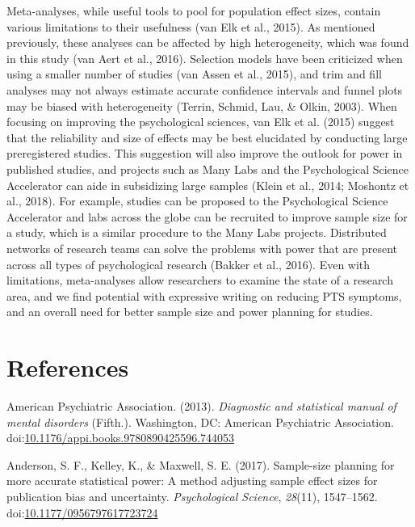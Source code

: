 \documentclass[,man]{apa6}
\begin{document}
Meta-analyses, while useful tools to pool for population effect sizes, contain various limitations to their usefulness (van Elk et al., 2015). As mentioned previously, these analyses can be affected by high heterogeneity, which was found in this study (van Aert et al., 2016). Selection models have been criticized when using a smaller number of studies (van Assen et al., 2015), and trim and fill analyses may not always estimate accurate confidence intervals and funnel plots may be biased with heterogeneity (Terrin, Schmid, Lau, \& Olkin, 2003). When focusing on improving the psychological sciences, van Elk et al. (2015) suggest that the reliability and size of effects may be best elucidated by conducting large preregistered studies. This suggestion will also improve the outlook for power in published studies, and projects such as Many Labs and the Psychological Science Accelerator can aide in subsidizing large samples (Klein et al., 2014; Moshontz et al., 2018). For example, studies can be proposed to the Psychological Science Accelerator and labs across the globe can be recruited to improve sample size for a study, which is a similar procedure to the Many Labs projects. Distributed networks of research teams can solve the problems with power that are present across all types of psychological research (Bakker et al., 2016). Even with limitations, meta-analyses allow researchers to examine the state of a research area, and we find potential with expressive writing on reducing PTS symptoms, and an overall need for better sample size and power planning for studies.

\newpage

\hypertarget{references}{%
\section{References}\label{references}}

\setlength{\parindent}{-0.5in}
\setlength{\leftskip}{0.5in}

\hypertarget{refs}{}
\leavevmode\hypertarget{ref-AmericanPsychiatricAssociation2013}{}%
American Psychiatric Association. (2013). \emph{Diagnostic and statistical manual of mental disorders} (Fifth.). Washington, DC: American Psychiatric Association. doi:\href{https://doi.org/10.1176/appi.books.9780890425596.744053}{10.1176/appi.books.9780890425596.744053}

\leavevmode\hypertarget{ref-Anderson2017a}{}%
Anderson, S. F., Kelley, K., \& Maxwell, S. E. (2017). Sample-size planning for more accurate statistical power: A method adjusting sample effect sizes for publication bias and uncertainty. \emph{Psychological Science}, \emph{28}(11), 1547--1562. doi:\href{https://doi.org/10.1177/0956797617723724}{10.1177/0956797617723724}
\end{document}
